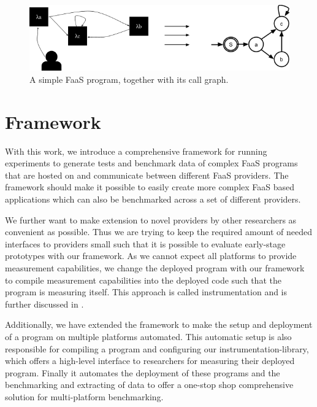 \documentclass[../main.tex]{subfiles}
\begin{document}
\begin{figure}
\begin{center}
  \includegraphics[width=\linewidth,keepaspectratio]{./simple-call-graph.png}
\end{center}
\caption[A FaaS Program's Call Graph]{A simple FaaS program, together with its call graph.}%
\label{fig:frameworkSimpleProgramCallGraph}
\end{figure}

\section{Framework}\label{sec:Framework}

With this work, we introduce a comprehensive framework for running experiments 
to generate tests and benchmark data of complex FaaS programs that are hosted on and communicate between different FaaS providers. 
The framework should make it possible to easily create more complex FaaS based applications which can also be benchmarked 
across a set of different providers.

We further want to make extension to novel providers by other researchers as convenient as possible. 
Thus we are trying to keep the required amount of needed interfaces to providers small 
such that it is possible to evaluate early-stage prototypes with our framework. 
As we cannot expect all platforms to provide measurement capabilities, 
we change the deployed program with our framework to compile measurement capabilities into the deployed code 
such that the program is measuring itself. 
This approach is called instrumentation and is further discussed in .

Additionally, we have extended the framework to make the setup and deployment of a program on multiple platforms automated. 
This automatic setup is also responsible for compiling a program and configuring our instrumentation-library, 
which offers a high-level interface to researchers for measuring their deployed program. 
Finally it automates the deployment of these programs and the benchmarking and extracting of data 
to offer a one-stop shop comprehensive solution for multi-platform benchmarking.
\end{document}
